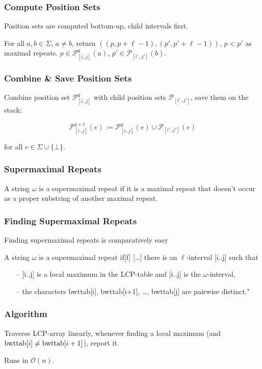 \documentclass[compress,handout]{beamer} %
\renewcommand{\O}{\mathcal{O}}
\begin{document}
\begin{frame}
	\frametitle{Compute Position Sets}
	Position sets are computed bottom-up, child intervals first.

	\vspace{2mm}
	For all $a,b \in \Sigma$, $a \ne b$, return $((p,p+\ell -1),
	(p',p'+\ell -1))$, $p<p'$ as maximal repeats.
	$p\in \mathcal{P}^{q}_{[i..j]}(a)$, $p'\in
	\mathcal{P}_{[i'..j']}(b)$.
\end{frame}

\begin{frame}
	\frametitle{Combine \& Save Position Sets}
	Combine position set $\mathcal{P}^{q}_{[i..j]}$ with child
	position sets $\mathcal{P}_{[i'..j']}$, save them on the stack:

	\begin{equation}
		\mathcal{P}^{q+1}_{[i..j]}(e):=\mathcal{P}^{q}_{[i..j]}(e) \cup \mathcal{P}_{[i'..j']}(e)
	\end{equation}

	for all $e \in \Sigma \cup \{\bot \}$.
\end{frame}

\begin{frame}
	\frametitle{Supermaximal Repeats}
	A string $\omega$ is a supermaximal repeat if it is a maximal
	repeat that doesn't occur as a proper substring of another
	maximal repeat.
\end{frame}

\begin{frame}
	\frametitle{Finding Supermaximal Repeats}
	Finding supermaximal repeats is comparatively easy

	\dq A string $\omega$ is a supermaximal repeat if[f] […] there is an
        $\ell$-interval [i..j] such that
	\begin{itemize}
		\item[–] [i..j] is a local maximum in the LCP-table and [i..j] is the $\omega$-interval,
		\item[–] the characters bwttab[i], bwttab[i+1], …, bwttab[j] are pairwise distinct."
	\end{itemize}
	\cite{abouelhoda2002enhanced}
\end{frame}

\begin{frame}
	\frametitle{Algorithm}
	Traverse LCP-array linearly, whenever finding a local maximum
	(and $\hbox{bwttab}[i] \neq \hbox{bwttab}[i+1]$), report it.

	Runs in $\O(n)$.
\end{frame}
\end{document}
